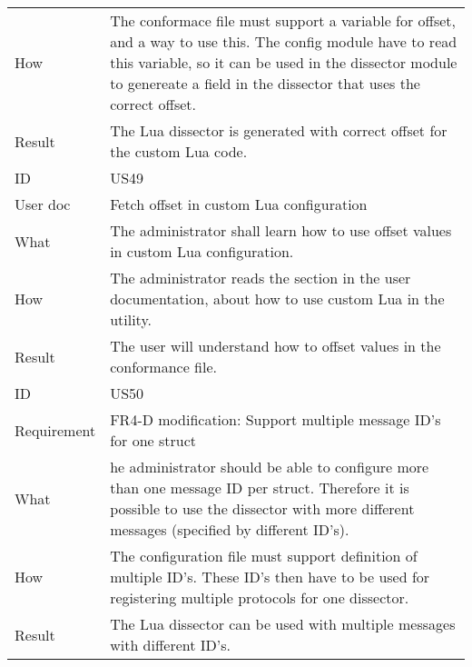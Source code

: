 \begin{table}[htbp]
{\begin{tabularx}{1.2\textwidth}{l X}
	How & The conformace file must support a variable for offset, and a way to use this. The config module have to read this variable, so it can be used in the dissector module to genereate a field in the dissector that uses the correct offset. \\
	Result & The Lua dissector is generated with correct offset for the custom Lua code. \\	
	\midrule
	ID & US49 \\
	User doc & Fetch offset in custom Lua configuration  \\
	What & The administrator shall learn how to use offset values in custom Lua configuration.   \\
	How & The administrator reads the section in the user documentation, about how to use custom Lua in the utility.  \\
	Result & The user will understand how to offset values in the conformance file. \\
	\midrule
	ID & US50 \\
	Requirement & FR4-D modification: Support multiple message ID's for one struct \\
	What & he administrator should be able to configure more than one message ID per struct. Therefore it is possible to use the dissector with more different messages (specified by different ID’s).    \\
	How & The configuration file must support definition of multiple ID’s. These ID’s then have to be used for registering multiple protocols for one dissector.  \\
	Result & The Lua dissector can be used with multiple messages with different ID’s. \\
	\bottomrule
\end{tabularx}}
\end{table}

